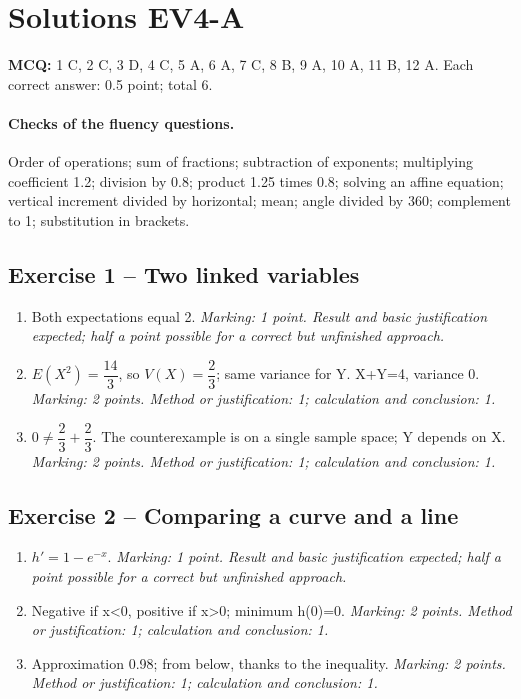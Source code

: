 \mxnewpage\section*{Solutions EV4-A}\label{EV4-A-CORR}
\textbf{MCQ:} 1 C, 2 C, 3 D, 4 C, 5 A, 6 A, 7 C, 8 B, 9 A, 10 A, 11 B, 12 A. Each correct answer: \num{0,5} point; total 6.
\paragraph{Checks of the fluency questions.} Order of operations; sum of fractions; subtraction of exponents; multiplying coefficient \num{1,2}; division by \num{0,8}; product \num{1,25} times \num{0,8}; solving an affine equation; vertical increment divided by horizontal; mean; angle divided by 360; complement to 1; substitution in brackets.
\subsection*{Exercise 1 -- Two linked variables}
\begin{enumerate}
\item Both expectations equal 2. \textit{Marking: 1 point. Result and basic justification expected; half a point possible for a correct but unfinished approach.}
\item $E(X^2)=\dfrac{14}{3}$, so $V(X)=\dfrac{2}{3}$; same variance for Y. X+Y=4, variance 0. \textit{Marking: 2 points. Method or justification: 1; calculation and conclusion: 1.}
\item $0\ne \dfrac{2}{3}+\dfrac{2}{3}$. The counterexample is on a single sample space; Y depends on X. \textit{Marking: 2 points. Method or justification: 1; calculation and conclusion: 1.}
\end{enumerate}
\subsection*{Exercise 2 -- Comparing a curve and a line}
\begin{enumerate}
\item $h\prime=1-e^{-x}$. \textit{Marking: 1 point. Result and basic justification expected; half a point possible for a correct but unfinished approach.}
\item Negative if x<0, positive if x>0; minimum h(0)=0. \textit{Marking: 2 points. Method or justification: 1; calculation and conclusion: 1.}
\item Approximation \num{0,98}; from below, thanks to the inequality. \textit{Marking: 2 points. Method or justification: 1; calculation and conclusion: 1.}
\end{enumerate}
